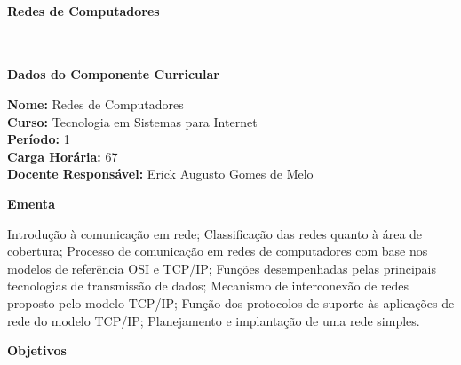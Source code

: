 \paragraph{Redes de Computadores} \


\begin{snugshade}\begin{center}\textbf{
	Dados do Componente Curricular
}\end{center}\end{snugshade}

\noindent 	\textbf{Nome:} Redes de Computadores
\\ 			\textbf{Curso:} Tecnologia em Sistemas para Internet
\\ 			\textbf{Período:} \unit{1}{\degree}
\\ 			\textbf{Carga Horária:} \unit{67}{\hour}
\\ 			\textbf{Docente Responsável:} Erick Augusto Gomes de Melo


\begin{snugshade}\begin{center}\textbf{
    Ementa
\vphantom{q}}\end{center}\end{snugshade}

\noindent

Introdução à comunicação em rede; Classificação das redes quanto à área de cobertura; Processo de comunicação em redes de computadores com base nos modelos de referência OSI e TCP/IP; Funções desempenhadas pelas principais tecnologias de transmissão de dados; Mecanismo de interconexão de redes proposto pelo modelo TCP/IP; Função dos protocolos de suporte às aplicações de rede do modelo TCP/IP; Planejamento e implantação de uma rede simples.


\begin{snugshade}\begin{center}\textbf{
    Objetivos
}\end{center}\end{snugshade}


